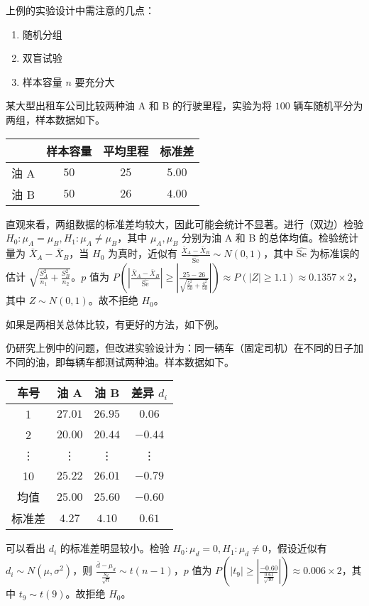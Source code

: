 \documentclass[../main.tex]{subfiles}
\begin{document}
上例的实验设计中需注意的几点：
\begin{enumerate}
    \item 随机分组
    \item 双盲试验
    \item 样本容量 $n$ 要充分大
\end{enumerate}

\begin{example}
    某大型出租车公司比较两种油 A 和 B 的行驶里程，实验为将 $100$ 辆车随机平分为两组，样本数据如下。

    \bigskip
    \begin{tabular}{|c|c|c|c|}
        \hline
             & 样本容量 & 平均里程 & 标准差 \\
        \hline
        油 A & $50$     & $25$     & $5.00$ \\
        \hline
        油 B & $50$     & $26$     & $4.00$ \\
        \hline
    \end{tabular}
    \bigskip

    直观来看，两组数据的标准差均较大，因此可能会统计不显著。进行（双边）检验 $H_0:\mu_A=\mu_B,H_1:\mu_A\neq\mu_B$，其中 $\mu_A,\mu_B$ 分别为油 A 和 B 的总体均值。检验统计量为 $\bar X_A-\bar X_B$，当 $H_0$ 为真时，近似有 $\frac{\bar X_A-\bar X_B}{\widehat{\mathrm{Se}}}\sim N(0,1)$，其中 $\widehat{\mathrm{Se}}$ 为标准误的估计 $\sqrt{\frac{S_A^2}{n_1}+\frac{S_B^2}{n_2}}$。$p$ 值为 $P(\left|\frac{\bar X_A-\bar X_B}{\widehat{\mathrm{Se}}}\right|\geq\left|\frac{25-26}{\sqrt{\frac{5^2}{50}+\frac{4^2}{50}}}\right|)\approx P(|Z|\geq1.1)\approx 0.1357\times2$，其中 $Z\sim N(0,1)$。故不拒绝 $H_0$。
\end{example}

如果是两相关总体比较，有更好的方法，如下例。

\begin{example}
    仍研究上例中的问题，但改进实验设计为：同一辆车（固定司机）在不同的日子加不同的油，即每辆车都测试两种油。样本数据如下。

    \bigskip
    \begin{tabular}{|c|c|c|c|}
        \hline
        车号   & 油 A    & 油 B    & 差异 $d_i$ \\
        \hline
        1      & $27.01$ & $26.95$ & $0.06$     \\
        \hline
        2      & $20.00$ & $20.44$ & $-0.44$    \\
        \hline
        \vdots & \vdots  & \vdots  & \vdots     \\
        \hline
        10     & $25.22$ & $26.01$ & $-0.79$    \\
        \hline
        均值   & $25.00$ & $25.60$ & $-0.60$    \\
        \hline
        标准差 & $4.27$  & $4.10$  & $0.61$     \\
        \hline
    \end{tabular}
    \bigskip

    可以看出 $d_i$ 的标准差明显较小。检验 $H_0:\mu_d=0,H_1:\mu_d\neq0$，假设近似有 $d_i\sim N(\mu,\sigma^2)$，则 $\frac{\bar d-\mu_d}{\frac{S_d}{\sqrt n}}\sim t(n-1)$，$p$ 值为 $P(|t_9|\geq\left|\frac{-0.60}{\frac{0.61}{\sqrt{10}}}\right|)\approx 0.006\times2$，其中 $t_9\sim t(9)$。故拒绝 $H_0$。
\end{example}
\end{document}
